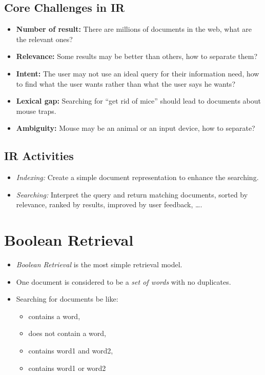 \documentclass[a4paper, 11pt, accentcolor = tud3b]{tudreport}
\begin{document}
            \subsection{Core Challenges in IR} %
                \begin{itemize}
                	\item \textbf{Number of result:} There are millions of documents in the web, what are the relevant ones?
                	\item \textbf{Relevance:} Some results may be better than others, how to separate them?
                	\item \textbf{Intent:} The user may not use an ideal query for their information need, how to find what the user wants rather than what the user says he wants?
                	\item \textbf{Lexical gap:} Searching for \enquote{get rid of mice} should lead to documents about mouse traps.
                	\item \textbf{Ambiguity:} Mouse may be an animal or an input device, how to separate?
                \end{itemize}

            \subsection{IR Activities} %
                \begin{itemize}
                	\item \textit{Indexing:} Create a simple document representation to enhance the searching.
                	\item \textit{Searching:} Interpret the query and return matching documents, sorted by relevance, ranked by results, improved by user feedback, \dots.
                \end{itemize}

        \section{Boolean Retrieval} %
            \begin{itemize}
            	\item \textit{Boolean Retrieval} is the most simple retrieval model.
            	\item One document is considered to be a \textit{set of words} with no duplicates.
            	\item Searching for documents be like:
            		\begin{itemize}
            			\item contains a word,
            			\item does not contain a word,
            			\item contains word1 and word2,
            			\item contains word1 or word2
            		\end{itemize}
            \end{itemize}
\end{document}
